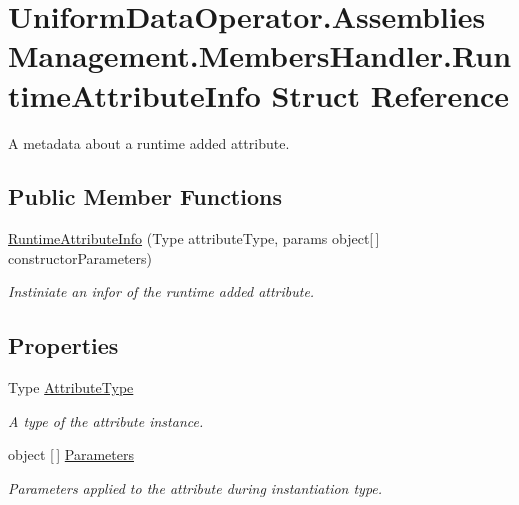 \hypertarget{struct_uniform_data_operator_1_1_assemblies_management_1_1_members_handler_1_1_runtime_attribute_info}{}\section{Uniform\+Data\+Operator.\+Assemblies\+Management.\+Members\+Handler.\+Runtime\+Attribute\+Info Struct Reference}
\label{struct_uniform_data_operator_1_1_assemblies_management_1_1_members_handler_1_1_runtime_attribute_info}


A metadata about a runtime added attribute.  


\subsection*{Public Member Functions}
\begin{DoxyCompactItemize}
\item 
\mbox{\hyperlink{struct_uniform_data_operator_1_1_assemblies_management_1_1_members_handler_1_1_runtime_attribute_info_a45baa9397521811a8e3bdc6cb2215067}{Runtime\+Attribute\+Info}} (Type attribute\+Type, params object\mbox{[}$\,$\mbox{]} constructor\+Parameters)
\begin{DoxyCompactList}\small\item\em Instiniate an infor of the runtime added attribute. \end{DoxyCompactList}\end{DoxyCompactItemize}
\subsection*{Properties}
\begin{DoxyCompactItemize}
\item 
Type \mbox{\hyperlink{struct_uniform_data_operator_1_1_assemblies_management_1_1_members_handler_1_1_runtime_attribute_info_ad2bdc32de1197f2e1660f3b2d970a082}{Attribute\+Type}}
\begin{DoxyCompactList}\small\item\em A type of the attribute instance. \end{DoxyCompactList}\item 
object \mbox{[}$\,$\mbox{]} \mbox{\hyperlink{struct_uniform_data_operator_1_1_assemblies_management_1_1_members_handler_1_1_runtime_attribute_info_afd71e1f3850bd096fb8e1bab8ecdc62b}{Parameters}}
\begin{DoxyCompactList}\small\item\em Parameters applied to the attribute during instantiation type. \end{DoxyCompactList}\end{DoxyCompactItemize}



